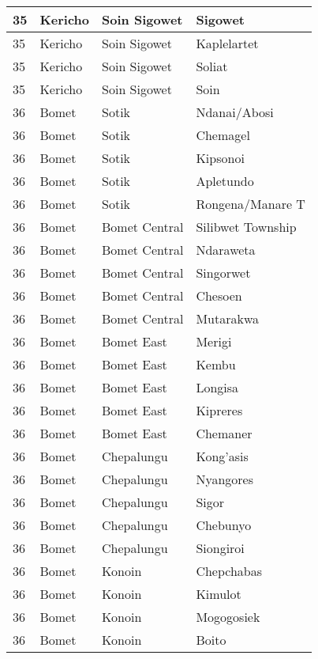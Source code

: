 \begin{table}[!ht]
\begin{tabular}{|l|l|l|l|}
        35 & Kericho & Soin Sigowet & Sigowet \\ \hline
        35 & Kericho & Soin Sigowet & Kaplelartet \\ \hline
        35 & Kericho & Soin Sigowet & Soliat \\ \hline
        35 & Kericho & Soin Sigowet & Soin \\ \hline
        36 & Bomet & Sotik & Ndanai/Abosi \\ \hline
        36 & Bomet & Sotik & Chemagel \\ \hline
        36 & Bomet & Sotik & Kipsonoi \\ \hline
        36 & Bomet & Sotik & Apletundo \\ \hline
        36 & Bomet & Sotik & Rongena/Manare T \\ \hline
        36 & Bomet & Bomet Central & Silibwet Township \\ \hline
        36 & Bomet & Bomet Central & Ndaraweta \\ \hline
        36 & Bomet & Bomet Central & Singorwet \\ \hline
        36 & Bomet & Bomet Central & Chesoen \\ \hline
        36 & Bomet & Bomet Central & Mutarakwa \\ \hline
        36 & Bomet & Bomet East & Merigi \\ \hline
        36 & Bomet & Bomet East & Kembu \\ \hline
        36 & Bomet & Bomet East & Longisa \\ \hline
        36 & Bomet & Bomet East & Kipreres \\ \hline
        36 & Bomet & Bomet East & Chemaner \\ \hline
        36 & Bomet & Chepalungu & Kong’asis \\ \hline
        36 & Bomet & Chepalungu & Nyangores \\ \hline
        36 & Bomet & Chepalungu & Sigor \\ \hline
        36 & Bomet & Chepalungu & Chebunyo \\ \hline
        36 & Bomet & Chepalungu & Siongiroi \\ \hline
        36 & Bomet & Konoin & Chepchabas \\ \hline
        36 & Bomet & Konoin & Kimulot \\ \hline
        36 & Bomet & Konoin & Mogogosiek \\ \hline
        36 & Bomet & Konoin & Boito \\ \hline

\end{tabular}
\end{table}
